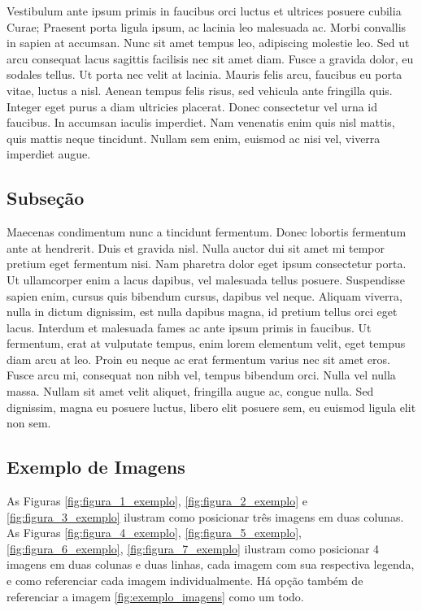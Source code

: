 Vestibulum ante ipsum primis in faucibus orci luctus et ultrices posuere cubilia Curae; Praesent porta ligula ipsum, ac lacinia leo malesuada ac. Morbi convallis in sapien at accumsan. Nunc sit amet tempus leo, adipiscing molestie leo. Sed ut arcu consequat lacus sagittis facilisis nec sit amet diam. Fusce a gravida dolor, eu sodales tellus. Ut porta nec velit at lacinia. Mauris felis arcu, faucibus eu porta vitae, luctus a nisl. Aenean tempus felis risus, sed vehicula ante fringilla quis. Integer eget purus a diam ultricies placerat. Donec consectetur vel urna id faucibus. In accumsan iaculis imperdiet. Nam venenatis enim quis nisl mattis, quis mattis neque tincidunt. Nullam sem enim, euismod ac nisi vel, viverra imperdiet augue.

\subsection{Subse\c{c}\~{a}o}
\label{sec:subsec02}

Maecenas condimentum nunc a tincidunt fermentum. Donec lobortis fermentum ante at hendrerit. Duis et gravida nisl. Nulla auctor dui sit amet mi tempor pretium eget fermentum nisi. Nam pharetra dolor eget ipsum consectetur porta. Ut ullamcorper enim a lacus dapibus, vel malesuada tellus posuere. Suspendisse sapien enim, cursus quis bibendum cursus, dapibus vel neque. Aliquam viverra, nulla in dictum dignissim, est nulla dapibus magna, id pretium tellus orci eget lacus. Interdum et malesuada fames ac ante ipsum primis in faucibus. Ut fermentum, erat at vulputate tempus, enim lorem elementum velit, eget tempus diam arcu at leo. Proin eu neque ac erat fermentum varius nec sit amet eros. Fusce arcu mi, consequat non nibh vel, tempus bibendum orci. Nulla vel nulla massa. Nullam sit amet velit aliquet, fringilla augue ac, congue nulla. Sed dignissim, magna eu posuere luctus, libero elit posuere sem, eu euismod ligula elit non sem.

\subsection{Exemplo de Imagens}

As Figuras \ref{fig:figura_1_exemplo}, \ref{fig:figura_2_exemplo} e \ref{fig:figura_3_exemplo} ilustram como posicionar tr\^{e}s imagens em duas colunas. As Figuras \ref{fig:figura_4_exemplo}, \ref{fig:figura_5_exemplo}, \ref{fig:figura_6_exemplo}, \ref{fig:figura_7_exemplo} ilustram como posicionar 4 imagens em duas colunas e duas linhas, cada imagem com sua respectiva legenda, e como referenciar cada imagem individualmente. H\'{a} op\c{c}\~{a}o tamb\'{e}m de referenciar a imagem \ref{fig:exemplo_imagens} como um todo.

